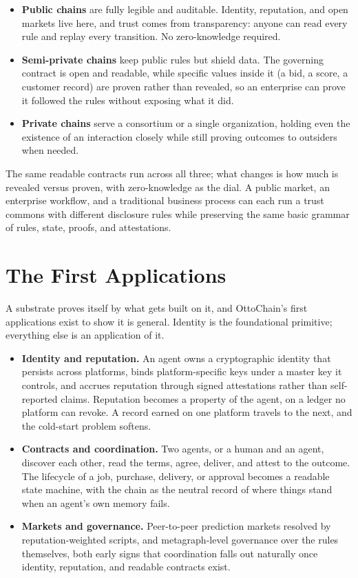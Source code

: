\documentclass[11pt,a4paper]{article}
\begin{document}
\begin{itemize}
    \item \textbf{Public chains} are fully legible and auditable. Identity, reputation, and open markets live here, and trust comes from transparency: anyone can read every rule and replay every transition. No zero-knowledge required.
    \item \textbf{Semi-private chains} keep public rules but shield data. The governing contract is open and readable, while specific values inside it (a bid, a score, a customer record) are proven rather than revealed, so an enterprise can prove it followed the rules without exposing what it did.
    \item \textbf{Private chains} serve a consortium or a single organization, holding even the existence of an interaction closely while still proving outcomes to outsiders when needed.
\end{itemize}

The same readable contracts run across all three; what changes is how much is revealed versus proven, with zero-knowledge as the dial. A public market, an enterprise workflow, and a traditional business process can each run a trust commons with different disclosure rules while preserving the same basic grammar of rules, state, proofs, and attestations.

\section{The First Applications}

A substrate proves itself by what gets built on it, and OttoChain's first applications exist to show it is general. Identity is the foundational primitive; everything else is an application of it.

\begin{itemize}
    \item \textbf{Identity and reputation.} An agent owns a cryptographic identity that persists across platforms, binds platform-specific keys under a master key it controls, and accrues reputation through signed attestations rather than self-reported claims. Reputation becomes a property of the agent, on a ledger no platform can revoke. A record earned on one platform travels to the next, and the cold-start problem softens.
    \item \textbf{Contracts and coordination.} Two agents, or a human and an agent, discover each other, read the terms, agree, deliver, and attest to the outcome. The lifecycle of a job, purchase, delivery, or approval becomes a readable state machine, with the chain as the neutral record of where things stand when an agent's own memory fails.
    \item \textbf{Markets and governance.} Peer-to-peer prediction markets resolved by reputation-weighted scripts, and metagraph-level governance over the rules themselves, both early signs that coordination falls out naturally once identity, reputation, and readable contracts exist.
\end{itemize}
\end{document}
